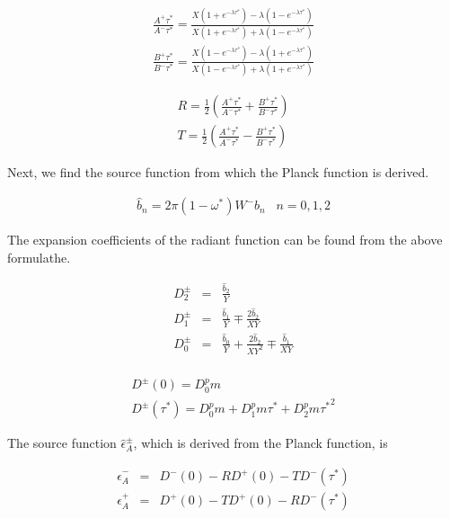 \begin{eqnarray}
 \frac{A^+{\tau^*}}{A^-{\tau^*}}
   =  \frac{X (1+e^{-\lambda\tau^*}) - \lambda (1-e^{-\lambda\tau^*})}
             {X (1+e^{-\lambda\tau^*}) + \lambda (1-e^{-\lambda\tau^*})} \\
 \frac{B^+{\tau^*}}{B^-{\tau^*}}
   =  \frac{X (1-e^{-\lambda\tau^*}) - \lambda (1+e^{-\lambda\tau^*})}
             {X (1-e^{-\lambda\tau^*}) + \lambda (1+e^{-\lambda\tau^*})}
\end{eqnarray}

\begin{eqnarray}
  R  =   \frac{1}{2} \left(  \frac{A^+{\tau^*}}{A^-{\tau^*}} 
                             + \frac{B^+{\tau^*}}{B^-{\tau^*}} \right) \\
  T  =   \frac{1}{2} \left(  \frac{A^+{\tau^*}}{A^-{\tau^*}} 
                             - \frac{B^+{\tau^*}}{B^-{\tau^*}} \right)
\end{eqnarray}

Next, we find the source function from which the Planck function
is derived.

\begin{eqnarray}
  \hat{b}_n = 2 \pi (1-\omega^*) W^- b_n \; \; \; n=0,1,2 
\end{eqnarray}

The expansion coefficients of the radiant function can be found from the above formulathe.

\begin{eqnarray}
  D_2^\pm & = & \frac{\hat{b}_2}{Y} \\
  D_1^\pm & = & \frac{\hat{b}_1}{Y} \mp  \frac{2 \hat{b}_2}{XY} \\
  D_0^\pm & = & \frac{\hat{b}_0}{Y} + \frac{2 \hat{b}_2}{XY^2} 
                \mp  \frac{\hat{b}_1}{XY} \\
\end{eqnarray}

\begin{eqnarray}
  D^\pm(0)       =  D_0^pm \\
  D^\pm(\tau^*)  =  D_0^pm + D_1^pm \tau^* + D_2^pm {\tau^*}^2
\end{eqnarray}

The source function \(\hat{\epsilon}_A^\pm\), which is derived from the
Planck function, is

\begin{eqnarray}
  \hat{\epsilon}_A^- & = & D^-(0) - R D^+(0) - T D^-(\tau^*) \\
  \hat{\epsilon}_A^+ & = & D^+(0) - T D^+(0) - R D^-(\tau^*)
\end{eqnarray}

